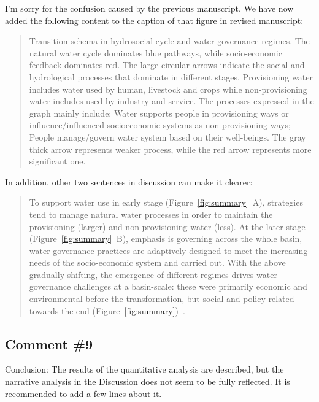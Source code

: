 \AR{} I'm sorry for the confusion caused by the previous manuscript. We have now added the following content to the caption of that figure in revised manuscript:

\begin{quote}
    Transition schema in hydrosocial cycle and water governance regimes. The natural water cycle dominates blue pathways, while socio-economic feedback dominates red.
    The large circular arrows indicate the social and hydrological processes that dominate in different stages.
    Provisioning water includes water used by human, livestock and crops while non-provisioning water includes used by industry and service.
    The processes expressed in the graph mainly include: Water supports people in provisioning ways or influence/influenced socioeconomic systems as non-provisioning ways; People manage/govern water system based on their well-beings.
    The gray thick arrow represents weaker process, while the red arrow represents more significant one.
\end{quote}

\AR*{} In addition, other two sentences in discussion can make it clearer:

\begin{quote}
    To support water use in early stage (Figure~\ref{fig:summary}~A), strategies tend to manage natural water processes in order to maintain the provisioning (larger) and non-provisioning water (less).
    At the later stage (Figure~\ref{fig:summary}~B), emphasis is governing across the whole basin, water governance practices are adaptively designed to meet the increasing needs of the socio-economic system and carried out.
    With the above gradually shifting, the emergence of different regimes drives water governance challenges at a basin-scale: these were primarily economic and environmental before the transformation, but social and policy-related towards the end (Figure~\ref{fig:summary})~\cite{singh2019,porcher2019}.
\end{quote}

\subsection{Comment \#9}
\RC{} Conclusion: The results of the quantitative analysis are described, but the narrative analysis in the Discussion does not seem to be fully reflected. It is recommended to add a few lines about it.


